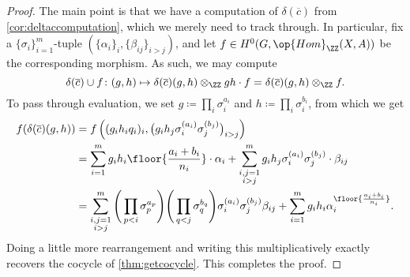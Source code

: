 \documentclass{article}
\numberwithin{equation}{section}
\begin{document}
\begin{proof}
	The main point is that we have a computation of $\delta(\overline c)$ from \autoref{cor:deltaccomputation}, which we merely need to track through. In particular, fix a $\{\sigma_i\}_{i=1}^m$-tuple $(\{\alpha_i\}_i,\{\beta_{ij}\}_{i>j})$, and let $f\in H^0(G,\op{Hom}_\ZZ(X,A))$ be the corresponding morphism. As such, we may compute
	\[\delta(\overline c)\cup f\colon(g,h)\mapsto\delta(\overline c)(g,h)\otimes_\ZZ gh\cdot f=\delta(\overline c)(g,h)\otimes_\ZZ f.\]
	To pass through evaluation, we set $g\coloneqq\prod_i\sigma_i^{a_i}$ and $h\coloneqq\prod_i\sigma_i^{b_i}$, from which we get
	\begin{align*}
		f(\delta(\overline c)(g,h)) &= f\left((g_ih_iq_i)_i,\big(g_ih_j\sigma_i^{(a_i)}\sigma_j^{(b_j)}\big)_{i>j}\right) \\
		&= \sum_{i=1}^mg_ih_i\floor{\frac{a_i+b_i}{n_i}}\cdot\alpha_i+\sum_{\substack{i,j=1\\i>j}}^mg_ih_j\sigma_i^{(a_i)}\sigma_j^{(b_j)}\cdot\beta_{ij} \\
		&= \sum_{\substack{i,j=1\\i>j}}^m\Bigg(\prod_{p<i}\sigma_p^{a_p}\Bigg)\Bigg(\prod_{q<j}\sigma_q^{b_q}\Bigg)\sigma_i^{(a_i)}\sigma_j^{(b_j)}\beta_{ij}+\sum_{i=1}^mg_ih_i\alpha_i^{\floor{\frac{a_i+b_i}{n_i}}}.
	\end{align*}
	Doing a little more rearrangement and writing this multiplicatively exactly recovers the cocycle of \autoref{thm:getcocycle}. This completes the proof.
\end{proof}
\end{document}
